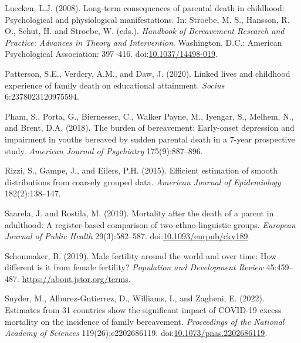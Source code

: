 \documentclass[
  11pt,
  letterpaper,
]{article}
\newlength{\cslhangindent}
\newlength{\cslentryspacingunit} %
\newenvironment{CSLReferences}[2] %
 {%
  \setlength{\parindent}{0pt}
  \ifodd #1
  \let\oldpar\par
  \def\par{\hangindent=\cslhangindent\oldpar}
  \fi
  \setlength{\parskip}{#2\cslentryspacingunit}
 }%
 {}
\begin{document}
\begin{CSLReferences}{1}{0}
\leavevmode{}%
Luecken, L.J. (2008). Long-term consequences of parental death in childhood: Psychological and physiological manifestations. In: Stroebe, M. S., Hansson, R. O., Schut, H. and Stroebe, W. (eds.). \emph{Handbook of Bereavement Research and Practice: Advances in Theory and Intervention}. Washington, D.C.: American Psychological Association: 397--416. doi:\href{https://doi.org/10.1037/14498-019}{10.1037/14498-019}.

\leavevmode{}%
Patterson, S.E., Verdery, A.M., and Daw, J. (2020). Linked lives and childhood experience of family death on educational attainment. \emph{Socius} 6:2378023120975594.

\leavevmode{}%
Pham, S., Porta, G., Biernesser, C., Walker Payne, M., Iyengar, S., Melhem, N., and Brent, D.A. (2018). The burden of bereavement: Early-onset depression and impairment in youths bereaved by sudden parental death in a 7-year prospective study. \emph{American Journal of Psychiatry} 175(9):887--896.

\leavevmode{}%
Rizzi, S., Gampe, J., and Eilers, P.H. (2015). Efficient estimation of smooth distributions from coarsely grouped data. \emph{American Journal of Epidemiology} 182(2):138--147.

\leavevmode{}%
Saarela, J. and Rostila, M. (2019). Mortality after the death of a parent in adulthood: A register-based comparison of two ethno-linguistic groups. \emph{European Journal of Public Health} 29(3):582--587. doi:\href{https://doi.org/10.1093/eurpub/cky189}{10.1093/eurpub/cky189}.

\leavevmode{}%
Schoumaker, B. (2019). Male fertility around the world and over time: How different is it from female fertility? \emph{Population and Development Review} 45:459--487. \url{https://about.jstor.org/terms}.

\leavevmode{}%
Snyder, M., Alburez-Gutierrez, D., Williams, I., and Zagheni, E. (2022). Estimates from 31 countries show the significant impact of COVID-19 excess mortality on the incidence of family bereavement. \emph{Proceedings of the National Academy of Sciences} 119(26):e2202686119. doi:\href{https://doi.org/10.1073/pnas.2202686119}{10.1073/pnas.2202686119}.


\end{CSLReferences}
\end{document}
